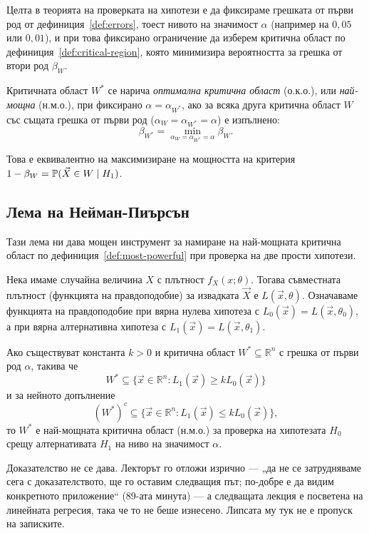 Целта в теорията на проверката на хипотези е да фиксираме грешката от първи род от дефиниция~\ref{def:errors}, тоест нивото на значимост $\alpha$ (например на $0{,}05$ или $0{,}01$), и при това фиксирано ограничение да изберем критична област по дефиниция~\ref{def:critical-region}, която минимизира вероятността за грешка от втори род $\beta_W$.

\begin{defn}\label{def:most-powerful}
Критичната област $W^*$ се нарича \emph{оптимална критична област} (о.к.о.), или \emph{най-мощна} (н.м.о.), при фиксирано $\alpha = \alpha_{W^*}$, ако за всяка друга критична област $W$ със същата грешка от първи род ($\alpha_W = \alpha_{W^*} = \alpha$) е изпълнено:
\[
\beta_{W^*} = \min_{\alpha_W = \alpha_{W^*} = \alpha} \beta_W .
\]
\end{defn}

Това е еквивалентно на максимизиране на мощността на критерия $1 - \beta_W = \mathbb{P}(\vec{X} \in W \mid H_1)$.

\subsection{Лема на Нейман-Пиърсън}
Тази лема ни дава мощен инструмент за намиране на най-мощната критична област по дефиниция~\ref{def:most-powerful} при проверка на две прости хипотези.

Нека имаме случайна величина $X$ с плътност $f_X(x; \theta)$. Тогава съвместната плътност (функцията на правдоподобие) за извадката $\vec{X}$ е $L(\vec{x}, \theta)$. Означаваме функцията на правдоподобие при вярна нулева хипотеза с $L_0(\vec{x}) = L(\vec{x}, \theta_0)$, а при вярна алтернативна хипотеза с $L_1(\vec{x}) = L(\vec{x}, \theta_1)$.

\begin{keylem}\label{lem:neyman-pearson}
Ако съществуват константа $k > 0$ и критична област $W^* \subseteq \mathbb{R}^n$ с грешка от първи род $\alpha$, такива че
\[
W^* \subseteq \{ \vec{x} \in \mathbb{R}^n : L_1(\vec{x}) \ge k L_0(\vec{x}) \}
\]
и за нейното допълнение
\[
(W^*)^c \subseteq \{ \vec{x} \in \mathbb{R}^n : L_1(\vec{x}) \le k L_0(\vec{x}) \} ,
\]
то $W^*$ е най-мощната критична област (н.м.о.) за проверка на хипотезата $H_0$ срещу алтернативата $H_1$ на ниво на значимост $\alpha$.
\end{keylem}

\noindent
Доказателство не се дава. Лекторът го отложи изрично — „да не се затрудняваме сега с
доказателството, ще го оставим следващия път; по-добре е да видим конкретното приложение“
(89-ата минута) — а следващата лекция е посветена на линейната регресия, така че то не
беше изнесено. Липсата му тук не е пропуск на записките.

